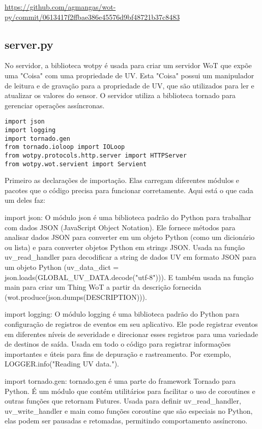 \url{https://github.com/agmangas/wot-py/commit/0613417f2ffbae386e45576d9bf48721b37c8483}

\subsection{server.py}

No servidor, a biblioteca wotpy é usada para criar um servidor WoT que expõe uma "Coisa" com uma propriedade de UV. Esta "Coisa" possui um manipulador de leitura e de gravação para a propriedade de UV, que são utilizados para ler e atualizar os valores do sensor. O servidor utiliza a biblioteca tornado para gerenciar operações assíncronas.

\begin{verbatim}
import json
import logging
import tornado.gen
from tornado.ioloop import IOLoop
from wotpy.protocols.http.server import HTTPServer
from wotpy.wot.servient import Servient
\end{verbatim}

Primeiro as declarações de importação. Elas carregam diferentes módulos e pacotes que o código precisa para funcionar corretamente. Aqui está o que cada um deles faz:

import json: 
O módulo json é uma biblioteca padrão do Python para trabalhar com dados JSON (JavaScript Object Notation). Ele fornece métodos para analisar dados JSON para converter em um objeto Python (como um dicionário ou lista) e para converter objetos Python em strings JSON.
Usada na função uv\_read\_handler para decodificar a string de dados UV em formato JSON para um objeto Python (uv\_data\_dict = json.loads(GLOBAL\_UV\_DATA.decode("utf-8"))). E também usada na função main para criar um Thing WoT a partir da descrição fornecida (wot.produce(json.dumps(DESCRIPTION))).

import logging: 
O módulo logging é uma biblioteca padrão do Python para configuração de registros de eventos em seu aplicativo. Ele pode registrar eventos em diferentes níveis de severidade e direcionar esses registros para uma variedade de destinos de saída.
Usada em todo o código para registrar informações importantes e úteis para fins de depuração e rastreamento. Por exemplo, LOGGER.info("Reading UV data.").

import tornado.gen: 
tornado.gen é uma parte do framework Tornado para Python. É um módulo que contém utilitários para facilitar o uso de coroutines e outras funções que retornam Futures.
Usada para definir uv\_read\_handler, uv\_write\_handler e main como funções coroutine que são especiais no Python, elas podem ser pausadas e retomadas, permitindo comportamento assíncrono.

